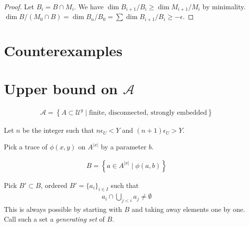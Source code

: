 \documentclass{amsart}
\renewcommand{\AA}{\mathscr A}
\newcommand{\U}{\mathcal U}
\newcommand{\curly}[1]{\left\{#1\right\}}
\begin{document}
\begin{proof}
	Let $B_i = B \cap M_i$.
	We have $\dim B_{i+1}/B_i \geq \dim M_{i+1}/M_i$ by minimality.
	$\dim B / (M_0 \cap B) = \dim B_n / B_0 = \sum \dim B_{i+1}/B_i \geq -\epsilon$.
\end{proof}

\section{Counterexamples}



\section{Upper bound on $\AA$}

\begin{Definition}
	\begin{align*}
		\AA = \curly{A \subset \U^{y} \mid \text{finite, disconnected, strongly embedded}}
	\end{align*}
\end{Definition}

Let $n$ be the integer such that $n \epsilon_U < Y$ and $(n+1) \epsilon_U > Y$.

Pick a trace of $\phi(x,y)$ on $A^{|x|}$ by a parameter $b$.

\begin{align*}
	B = \curly{a \in A^{|x|} \mid \phi(a, b)}
\end{align*}

Pick $B' \subset B$, ordered $B' = \{a_i\}_{i \in I}$ such that
\begin{align*}
	a_i \cap \bigcup_{j < i} a_j \neq \emptyset
\end{align*}
This is always possible by starting with $B$ and taking away elements one by one.
Call such a set a \emph{generating set} of $B$.
\end{document}
